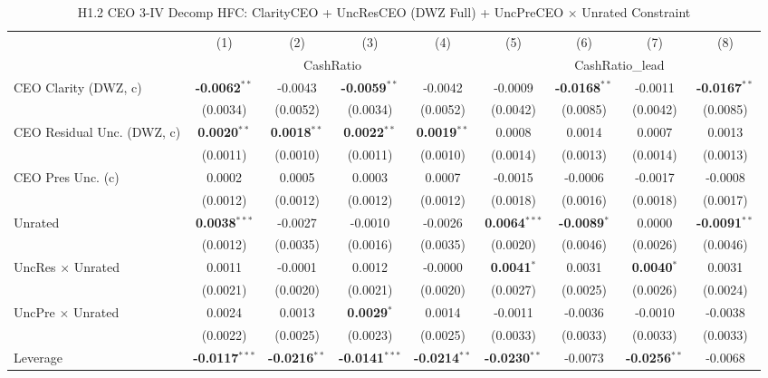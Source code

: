 \documentclass[11pt,a4paper]{article}
\begin{document}
\begin{table}[htbp]
\centering
\caption{H1.2 CEO 3-IV Decomp HFC: ClarityCEO + UncResCEO (DWZ Full) + UncPreCEO $\times$ Unrated Constraint}
\label{tab:h1_2_ceo2_decomp}
\scriptsize
\begin{tabular}{lcccccccc}
\toprule
 & (1) & (2) & (3) & (4) & (5) & (6) & (7) & (8) \\
 & \multicolumn{4}{c}{CashRatio} & \multicolumn{4}{c}{CashRatio\_lead} \\
\cmidrule(lr){2-5} \cmidrule(lr){6-9}
\midrule
CEO Clarity (DWZ, c) & \textbf{-0.0062}$^{**}$ & -0.0043 & \textbf{-0.0059}$^{**}$ & -0.0042 & -0.0009 & \textbf{-0.0168}$^{**}$ & -0.0011 & \textbf{-0.0167}$^{**}$ \\
 & (0.0034) & (0.0052) & (0.0034) & (0.0052) & (0.0042) & (0.0085) & (0.0042) & (0.0085) \\
CEO Residual Unc. (DWZ, c) & \textbf{0.0020}$^{**}$ & \textbf{0.0018}$^{**}$ & \textbf{0.0022}$^{**}$ & \textbf{0.0019}$^{**}$ & 0.0008 & 0.0014 & 0.0007 & 0.0013 \\
 & (0.0011) & (0.0010) & (0.0011) & (0.0010) & (0.0014) & (0.0013) & (0.0014) & (0.0013) \\
CEO Pres Unc. (c) & 0.0002 & 0.0005 & 0.0003 & 0.0007 & -0.0015 & -0.0006 & -0.0017 & -0.0008 \\
 & (0.0012) & (0.0012) & (0.0012) & (0.0012) & (0.0018) & (0.0016) & (0.0018) & (0.0017) \\
Unrated & \textbf{0.0038}$^{***}$ & -0.0027 & -0.0010 & -0.0026 & \textbf{0.0064}$^{***}$ & \textbf{-0.0089}$^{*}$ & 0.0000 & \textbf{-0.0091}$^{**}$ \\
 & (0.0012) & (0.0035) & (0.0016) & (0.0035) & (0.0020) & (0.0046) & (0.0026) & (0.0046) \\
UncRes $\times$ Unrated & 0.0011 & -0.0001 & 0.0012 & -0.0000 & \textbf{0.0041}$^{*}$ & 0.0031 & \textbf{0.0040}$^{*}$ & 0.0031 \\
 & (0.0021) & (0.0020) & (0.0021) & (0.0020) & (0.0027) & (0.0025) & (0.0026) & (0.0024) \\
UncPre $\times$ Unrated & 0.0024 & 0.0013 & \textbf{0.0029}$^{*}$ & 0.0014 & -0.0011 & -0.0036 & -0.0010 & -0.0038 \\
 & (0.0022) & (0.0025) & (0.0023) & (0.0025) & (0.0033) & (0.0033) & (0.0033) & (0.0033) \\
\midrule
Leverage & \textbf{-0.0117}$^{***}$ & \textbf{-0.0216}$^{**}$ & \textbf{-0.0141}$^{***}$ & \textbf{-0.0214}$^{**}$ & \textbf{-0.0230}$^{**}$ & -0.0073 & \textbf{-0.0256}$^{**}$ & -0.0068 \\

\end{tabular}
\end{table}
\end{document}
